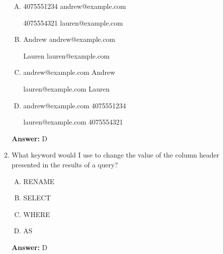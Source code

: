 \documentclass[12pt]{article}
\begin{document}
\begin{enumerate}[1.]
\begin{enumerate}[A.]
        \item
        4075551234	andrew@example.com

        \bigskip

        4075554321	lauren@example.com

        \item
        Andrew	andrew@example.com

        \bigskip

        Lauren	lauren@example.com

        \item
        andrew@example.com	Andrew

        \bigskip

        lauren@example.com	Lauren

        \item
        andrew@example.com	4075551234

        \bigskip

        lauren@example.com	4075554321
    \end{enumerate}

    \bigskip

    \textbf{Answer:} D

    \item

    What keyword would I use to change the value of the column header presented
    in the results of a query?

    \bigskip

    \begin{enumerate}[A.]
        \item RENAME
        \item SELECT
        \item WHERE
        \item AS
    \end{enumerate}

    \bigskip

    \textbf{Answer:} D

\end{enumerate}
\end{document}
